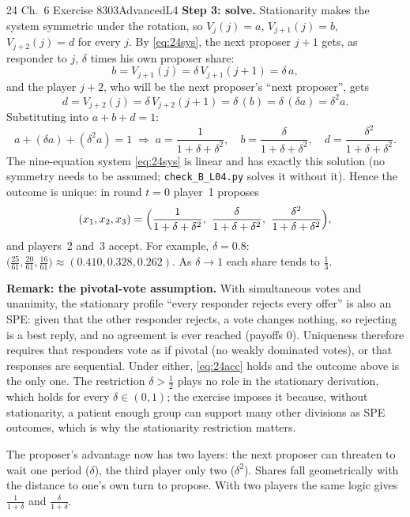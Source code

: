 \begin{exsol}{24}{\MG{} Ch.~6 Exercise 8}{303}{Advanced}{L4}
\textbf{Step 3: solve.} Stationarity makes the system symmetric under the rotation, so
$V_j(j) = a$, $V_{j+1}(j) = b$, $V_{j+2}(j) = d$ for every $j$. By \eqref{eq:24sys}, the next
proposer $j+1$ gets, as responder to $j$, $\delta$ times his own proposer share:
\[
  b = V_{j+1}(j) = \delta\, V_{j+1}(j+1) = \delta\,a ,
\]
and the player $j+2$, who will be the next proposer's ``next proposer'', gets
\[
  d = V_{j+2}(j) = \delta\, V_{j+2}(j+1) = \delta\,(b) = \delta\,(\delta a) = \delta^2 a .
\]
Substituting into $a + b + d = 1$:
\[
  a + (\delta a) + (\delta^2 a) = 1 \;\Rightarrow\;
  a = \frac{1}{1 + \delta + \delta^2},\quad b = \frac{\delta}{1 + \delta + \delta^2},\quad
  d = \frac{\delta^2}{1 + \delta + \delta^2}.
\]
The nine-equation system \eqref{eq:24sys} is linear and has exactly this solution (no symmetry needs
to be assumed; \texttt{check\_B\_L04.py} solves it without it). Hence the outcome is unique: in round
$t = 0$ player~1 proposes
\[
  (x_1, x_2, x_3) = \Bigl(\frac{1}{1+\delta+\delta^2},\ \frac{\delta}{1+\delta+\delta^2},\
  \frac{\delta^2}{1+\delta+\delta^2}\Bigr),
\]
and players~2 and~3 accept. For example, $\delta = 0.8$: $\bigl(\frac{25}{61}, \frac{20}{61},
\frac{16}{61}\bigr) \approx (0.410, 0.328, 0.262)$. As $\delta \to 1$ each share tends to $\frac13$.

\textbf{Remark: the pivotal-vote assumption.} With simultaneous votes and unanimity, the stationary
profile ``every responder rejects every offer'' is also an SPE: given that the other responder
rejects, a vote changes nothing, so rejecting is a best reply, and no agreement is ever reached
(payoffs $0$). Uniqueness therefore requires that responders vote as if pivotal (no weakly dominated
votes), or that responses are sequential. Under either, \eqref{eq:24acc} holds and the outcome above
is the only one. The restriction $\delta > \frac12$ plays no role in the stationary derivation, which
holds for every $\delta \in (0,1)$; the exercise imposes it because, without stationarity, a
patient enough group can support many other divisions as SPE outcomes, which is why the stationarity
restriction matters.

\interp The proposer's advantage now has two layers: the next proposer can threaten to wait one period
($\delta$), the third player only two ($\delta^2$). Shares fall geometrically with the distance to one's
own turn to propose. With two players the same logic gives $\frac{1}{1+\delta}$ and
$\frac{\delta}{1+\delta}$.


\end{exsol}
